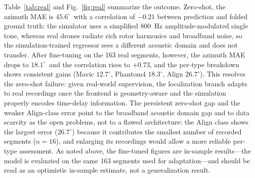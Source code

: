 \documentclass[5p,twocolumn]{elsarticle}
\begin{document}
Table~\ref{tab:real} and Fig.~\ref{fig:real} summarize the outcome. Zero-shot, the azimuth MAE is $45.6^\circ$\, with a correlation of $-0.21$ between prediction and folded ground truth: the simulator uses a simplified \SI{800}{\hertz} amplitude-modulated single tone, whereas real drones radiate rich rotor harmonics and broadband noise, so the simulation-trained regressor sees a different acoustic domain and does not transfer. After fine-tuning on the 163 real segments, however, the azimuth MAE drops to $\mathbf{18.1^\circ}$\, and the correlation rises to $\mathbf{+0.73}$, and the per-type breakdown shows consistent gains (Mavic $12.7^\circ$, Phantom4 $18.3^\circ$, Align $26.7^\circ$). This resolves the zero-shot failure: given real-world supervision, the localization branch adapts to real recordings once the frontend is geometry-aware and the simulation properly encodes time-delay information. The persistent zero-shot gap and the weaker Align-class error point to the broadband acoustic domain gap and to data scarcity as the open problems, not to a flawed architecture: the Align class shows the largest error ($26.7^\circ$) because it contributes the smallest number of recorded segments ($n=16$), and enlarging its recordings would allow a more reliable per-type assessment. As noted above, the fine-tuned figures are in-sample results---the model is evaluated on the same 163 segments used for adaptation---and should be read as an optimistic in-sample estimate, not a generalization result.
\end{document}
